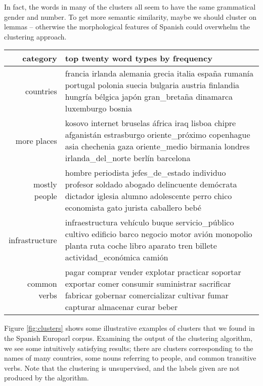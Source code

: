 In fact, the words in many of the clusters all seem to have the same
grammatical gender and number. To get more semantic similarity, maybe we should
cluster on lemmas -- otherwise the morphological features of Spanish could
overwhelm the clustering approach.

\begin{figure*}[t!]
  \begin{tabular}{|r|p{10cm}|}
    \hline
    category  & top twenty word types by frequency \\
    \hline
    countries & francia irlanda alemania grecia italia españa rumanía portugal polonia suecia bulgaria austria finlandia hungría bélgica japón gran\_bretaña dinamarca luxemburgo bosnia \\
    \hline
    more places & kosovo internet bruselas áfrica iraq lisboa chipre afganistán estrasburgo oriente\_próximo copenhague asia chechenia gaza oriente\_medio birmania londres irlanda\_del\_norte berlín barcelona \\
    \hline
    mostly people & hombre periodista jefes\_de\_estado individuo profesor soldado abogado delincuente demócrata dictador iglesia alumno adolescente perro chico economista gato jurista caballero bebé \\
    \hline
    infrastructure & infraestructura vehículo buque servicio\_público cultivo edificio barco negocio motor avión monopolio planta ruta coche libro aparato tren billete actividad\_económica camión \\
    \hline
    common verbs & pagar comprar vender explotar practicar soportar exportar comer consumir suministrar sacrificar fabricar gobernar comercializar cultivar fumar capturar almacenar curar beber \\
    \hline
  \end{tabular}
\caption{Some illustrative clusters found by the Brown clustering algorithm on
the Spanish Europarl data. These are five out of $C=1000$ clusters, and
were picked and labeled by hand. The words listed are the
top twenty terms from that cluster, by frequency.}
\label{fig:clusters}
\end{figure*}

Figure \ref{fig:clusters} shows some illustrative examples of clusters that
we found in the Spanish Europarl corpus.  Examining the output of the
clustering algorithm, we see some intuitively satisfying results; there are
clusters corresponding to the names of many countries, some nouns referring to
people, and common transitive verbs. Note that the clustering is unsupervised,
and the labels given are not produced by the algorithm.

